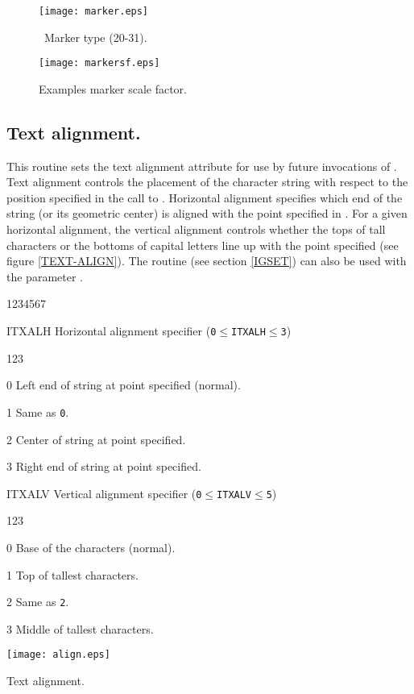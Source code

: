 \begin{figure}[p]
\begin{center}\texttt{[image: marker.eps]}\end{center}
\caption{\HIGZ~Marker type (20-31).}
\label{MARKER-TYPE}

\bigskip

\begin{center}\texttt{[image: markersf.eps]}\end{center}
\caption{Examples marker scale factor.}
\label{MARKER-SIZE}
\end{figure}
\clearpage
%
\subsection{Text alignment.}
\Action
This routine sets the text alignment attribute for use by future invocations
of . Text alignment controls the placement of the character string
with respect to the position specified in the call to . Horizontal
alignment specifies which end of the string (or its geometric center) is
aligned with the point specified in . For a given horizontal
alignment, the vertical alignment controls whether the tops of tall characters
or the bottoms of capital letters line up with the point specified (see figure
\ref{TEXT-ALIGN}). The routine  (see section \ref{IGSET}) can also
be used with the parameter .
\Pdesc
\begin{DLtt}{1234567}
\item[ITXALH] Horizontal alignment specifier ({\tt0$\leq$ITXALH$\leq$3})
\begin{DLtt}{123}
\item[0] Left end of string at point specified (normal).
\item[1] Same as {\tt 0}.
\item[2] Center of string at point specified.
\item[3] Right end of string at point specified.
\end{DLtt}
\item[ITXALV] Vertical alignment specifier ({\tt0\(\leq\)ITXALV\(\leq\)5})
\begin{DLtt}{123}
\item[0] Base of the characters (normal).
\item[1] Top of tallest characters.
\item[2] Same as {\tt 2}.
\item[3] Middle of tallest characters.
\end{DLtt}
\end{DLtt}
\begin{Fighere}
\begin{center}\texttt{[image: align.eps]}\end{center}
\caption{Text alignment.}
\label{TEXT-ALIGN}
\end{Fighere}
%
\newpage%
